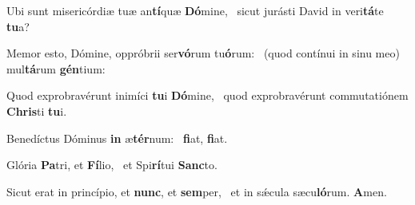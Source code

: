 \item Ubi sunt misericórdiæ tuæ an\textbf{tí}quæ \textbf{Dó}mine,~\psstar{} sicut jurásti David in veri\textbf{tá}te \textbf{tu}a?
\item Memor esto, Dómine, oppróbrii ser\textbf{vó}rum tu\textbf{ó}rum:~\psstar{} (quod contínui in sinu meo) mul\textbf{tá}rum \textbf{gén}tium:
\item Quod exprobravérunt inimíci \textbf{tu}i \textbf{Dó}mine,~\psstar{} quod exprobravérunt commutatiónem \textbf{Chris}ti \textbf{tu}i.
\item Benedíctus Dóminus \textbf{in} æ\textbf{tér}num:~\psstar{} \textbf{fi}at, \textbf{fi}at.
\item Glória \textbf{Pa}tri, et \textbf{Fí}lio,~\psstar{} et Spi\textbf{rí}tui \textbf{Sanc}to.
\item Sicut erat in princípio, et \textbf{nunc}, et \textbf{sem}per,~\psstar{} et in sǽcula sæcu\textbf{ló}rum. \textbf{A}men.
